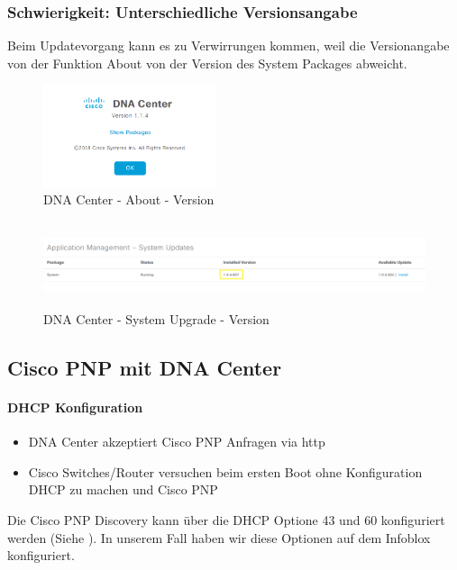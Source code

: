 \subsubsection{Schwierigkeit: Unterschiedliche Versionsangabe}

Beim Updatevorgang kann es zu Verwirrungen kommen, weil die Versionangabe von der Funktion About von der Version des System Packages abweicht.

\begin{figure}[H]
	\centering
	\includegraphics[height=3cm]{img/dna-center-about.png}
	\caption{DNA Center - About - Version}
	\label{fig:dna-center-about}
\end{figure}

\begin{figure}[H]
	\centering
	\includegraphics[height=2.5cm]{img/dna-center-system-upgrade-version.png}
	\caption{DNA Center - System Upgrade - Version}
	\label{fig:dna-center-system-upgrade}
\end{figure}

\subsection{Cisco PNP mit DNA Center}

\paragraph{DHCP Konfiguration}

\begin{itemize}
	\item DNA Center akzeptiert Cisco PNP Anfragen via http
	\item Cisco Switches/Router versuchen beim ersten Boot ohne Konfiguration DHCP zu machen und Cisco PNP
\end{itemize}

Die Cisco PNP Discovery kann über die DHCP Optione 43 und 60 konfiguriert werden (Siehe \cite{cisco-pnp-dhcp}). In unserem Fall haben wir diese Optionen auf dem Infoblox konfiguriert.

